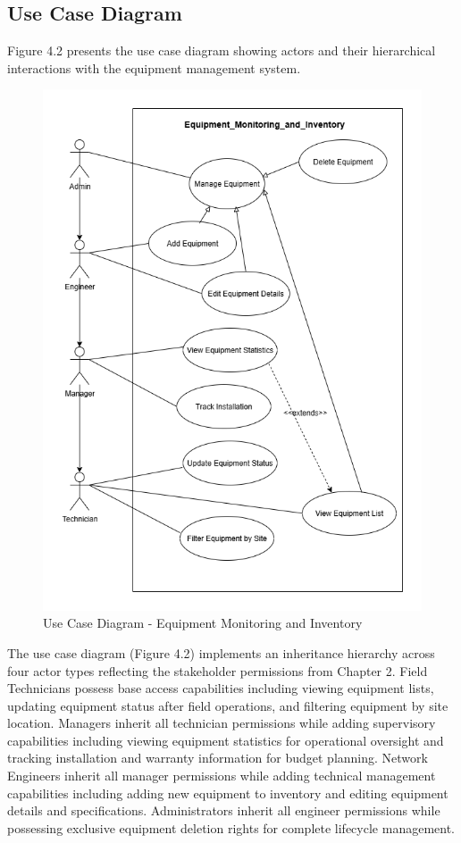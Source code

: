 \subsection{Use Case Diagram}

Figure 4.2 presents the use case diagram showing actors and their hierarchical interactions with the equipment management system.

\begin{figure}[H]
    \centering
    \includegraphics[width=0.85\linewidth]{img/chap_04/equipment_usecase_diagram.png}
    \caption{Use Case Diagram - Equipment Monitoring and Inventory}
    \label{fig:use_case_diagram_sprint2}
\end{figure}

The use case diagram (Figure 4.2) implements an inheritance hierarchy across four actor types reflecting the stakeholder permissions from Chapter 2. Field Technicians possess base access capabilities including viewing equipment lists, updating equipment status after field operations, and filtering equipment by site location. Managers inherit all technician permissions while adding supervisory capabilities including viewing equipment statistics for operational oversight and tracking installation and warranty information for budget planning. Network Engineers inherit all manager permissions while adding technical management capabilities including adding new equipment to inventory and editing equipment details and specifications. Administrators inherit all engineer permissions while possessing exclusive equipment deletion rights for complete lifecycle management.

